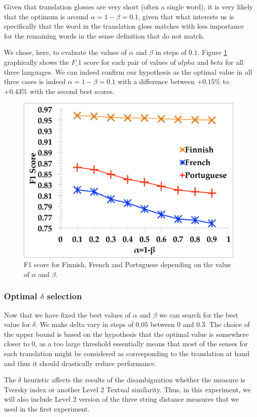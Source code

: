 \documentclass[10pt, a4paper]{article}
\begin{document}
Given that translation glosses are very short (often a single word), it is very likely that the optimum is around \(\alpha=1-\beta=0.1\), given that what interests us is specifically that the word in the translation gloss matches with less importance for the remaining words in the sense definition that do not match.

We chose, here, to evaluate the values of \(\alpha\) and \(\beta\) in steps of \(0.1\). Figure \ref{fig.1} graphically shows the \(F\_1\) score for each pair of values of \(alpha\) and \(beta\) for all three languages. We can indeed confirm our hypothesis as the optimal value in all three cases is indeed \(\alpha=1-\beta=0.1\) with a difference between \(+0.15\%\) to \(+0.43\%\) with the second best scores.
	
\begin{figure}\centering
\includegraphics[width=0.64\columnwidth]{alphabetafig}
\caption{F1 score for Finnish, French and Portuguese depending on the value of \(\alpha\) and \(\beta\).}
\label{fig.1}
\end{figure}

\subsubsection{Optimal \(\delta\) selection}
Now that we have fixed the best values of \(\alpha\) and \(\beta\) we can search for the best value for \(\delta\). We make delta vary in steps of \(0.05\) between \(0\) and \(0.3\). The choice of the upper bound is based on the hypothesis that the optimal value is somewhere closer to 0, as a too large threshold essentially means that most of the senses for each translation might be considered as corresponding to the translation at hand and thus it should drastically reduce performance. 

The \(\delta\) heuristic affects the results of the disambiguation whether the measure is  Tversky index or another Level 2 Textual similarity. Thus, in this experiment, we will also include Level 2 version of the three string distance measures that we used in the first experiment.
\end{document}
